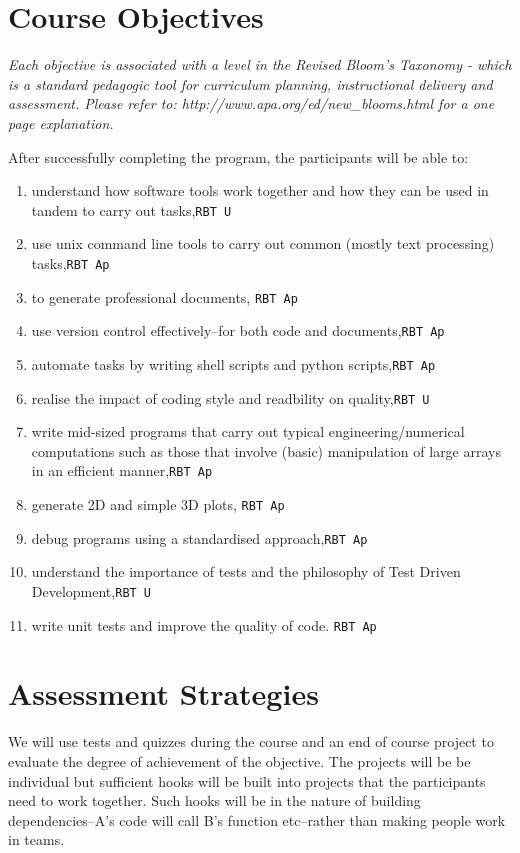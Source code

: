 \documentclass{article}
\begin{document}
\newpage

\section{Course Objectives}
\emph{Each objective is associated with a level in the Revised Bloom's
Taxonomy - which is a standard pedagogic tool for curriculum planning,
instructional delivery and assessment. Please refer to:
http://www.apa.org/ed/new\_blooms.html for a one page explanation.} 


After successfully completing the program, the participants will be able to:
\begin{enumerate}
\item \label{intro} understand how software tools work together and how they can be used in tandem to carry out tasks,\hfill \texttt{RBT U\phantom{p}}
\item \label{cmd} use unix command line tools to carry out common (mostly text processing) tasks,\hfill \texttt{RBT Ap}
\item \label{pdf} to generate professional documents, \hfill \texttt{RBT Ap}
\item \label{VC} use version control effectively--for both code and documents,\hfill \texttt{RBT Ap}
\item \label{scr} automate tasks by writing shell scripts and python scripts,\hfill \texttt{RBT Ap}
\item \label{sty} realise the impact of coding style and readbility on quality,\hfill \texttt{RBT U\phantom{p}}
\item \label{py} write mid-sized programs that carry out typical engineering/numerical computations such as those that involve (basic) manipulation of large arrays in an efficient manner,\hfill \texttt{RBT Ap}
\item \label{plot} generate 2D and simple 3D plots, \hfill \texttt{RBT Ap}
\item \label{dbg} debug programs using a standardised approach,\hfill \texttt{RBT Ap}
\item \label{test} understand the importance of tests and the philosophy of Test Driven Development,\hfill \texttt{RBT U\phantom{p}}
\item \label{unit} write unit tests and improve the quality of code.  \hfill \texttt{RBT Ap}
    \end{enumerate}
\section{Assessment Strategies}
We will use tests and quizzes during the course and an end of course project to evaluate the degree of achievement of the objective. The projects will be be individual but sufficient hooks will be built into projects that the participants need to work together. Such hooks will be in the nature of building dependencies--A's code will call B's function etc--rather than making people work in teams.
\end{document}
